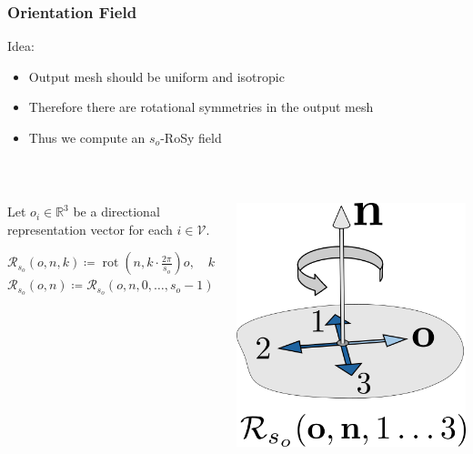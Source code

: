 \documentclass[aspectratio=43,sanserif,professionalfonts]{beamer}
\DeclareMathOperator{\rot}{rot}
\begin{document}
\begin{frame}
	\frametitle{Orientation Field}
	Idea:
	\begin{itemize}
		\item	Output mesh should be uniform and isotropic
		\item	Therefore there are rotational symmetries in the output mesh
		\item	Thus we compute an $s_o$-RoSy field
	\end{itemize}
	\pause
	~\\
	\begin{columns}
		\begin{column}{0.7\textwidth}
			Let $o_i \in \mathbb{R}^3$ be a directional representation vector for each $i \in \mathcal{V}$.\\

			\pause
			\begin{tcolorbox}[colback=green!5,colframe=green!40!black,title=Symmetry Group - Integer Rotations]
				$\mathcal{R}_{s_o}(o,n,k) \coloneqq \rot \left(n, k \cdot \frac{2\pi}{s_o} \right) o, \quad k \in \mathbb{Z}$ \\
				$\mathcal{R}_{s_o}(o,n) \coloneqq \mathcal{R}_{s_o}(o,n,0, \dots, s_o-1)$
			\end{tcolorbox}
		\end{column}
		\begin{column}{0.2\textwidth}
			\centering
			\includegraphics[width=\textwidth]{img/integer-rotation.png}
		\end{column}
	\end{columns}
\end{frame}
\end{document}
